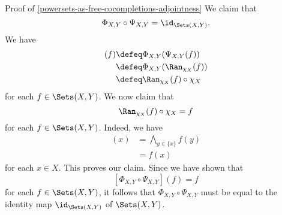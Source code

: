 \begin{Proof}{Proof of \cref{powersets-as-free-cocompletions-adjointness}}
    We claim that
    \[
        \Phi_{X,Y}\circ\Psi_{X,Y}%
        =%
        \id_{\Sets(X,Y)}.%
    \]%
    We have
    \begin{align*}
        [\Phi_{X,Y}\circ\Psi_{X,Y}](f) &\defeq  \Phi_{X,Y}(\Psi_{X,Y}(f))\\%
                                       &\defeq  \Phi_{X,Y}(\Ran_{\chi_{X}}(f))\\%
                                       &\defeq  \Ran_{\chi_{X}}(f)\circ\chi_{X}%
    \end{align*}
    for each $f\in\Sets(X,Y)$. We now claim that
    \[
        \Ran_{\chi_{X}}(f)\circ\chi_{X}%
        =%
        f%
    \]%
    for each $f\in\Sets(X,Y)$. Indeed, we have
    \begin{align*}
        [\Ran_{\chi_{X}}(f)\circ\chi_{X}](x) &= \bigwedge_{y\in\{x\}}f(y)\\%
                                             &= f(x)%
    \end{align*}
    for each $x\in X$. This proves our claim. Since we have shown that
    \[
        [\Phi_{X,Y}\circ\Psi_{X,Y}](f)%
        =%
        f%
    \]%
    for each $f\in\Sets(X,Y)$, it follows that $\Phi_{X,Y}\circ\Psi_{X,Y}$ must be equal to the identity map $\id_{\Sets(X,Y)}$ of $\Sets(X,Y)$.


\end{Proof}
